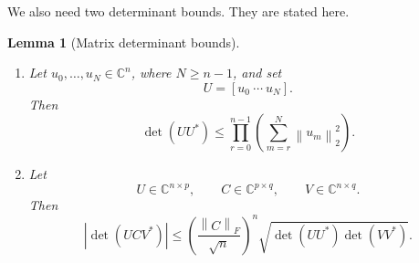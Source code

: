\documentclass[11pt]{article}
\newtheorem{lemma}[lemma]{Lemma}
\theoremstyle{definition}
\theoremstyle{remark}
\newcommand{\C}{\mathbb{C}}
\newcommand{\norm}[1]{\left\lVert #1\right\rVert}
\newcommand{\abs}[1]{\left\lvert #1\right\rvert}
\begin{document}
We also need two determinant bounds. They are stated here.
\begin{lemma}[Matrix determinant bounds]
\label{lem:analytic-finite-volume}
\leavevmode
\begin{enumerate}

\item Let \(u_0,\ldots,u_N\in\C^n\), where \(N\ge n-1\), and set
\[
    U=[u_0\ \cdots\ u_N].
\]
Then
\begin{equation}
    \det(UU^*)
    \le
    \prod_{r=0}^{n-1}
    \left(
      \sum_{m=r}^N\norm{u_m}_2^2
    \right).
    \label{eq:analytic-gram-tail}
\end{equation}

\item Let
\[
    U\in\C^{n\times p},
    \qquad
    C\in\C^{p\times q},
    \qquad
    V\in\C^{n\times q}.
\]
Then
\begin{equation}
    \abs{\det(UCV^*)}
    \le
    \left(\frac{\norm{C}_F}{\sqrt n}\right)^n
    \sqrt{\det(UU^*)\det(VV^*)}.
    \label{eq:analytic-finite-factorization}
\end{equation}
\end{enumerate}
\end{lemma}
\end{document}
